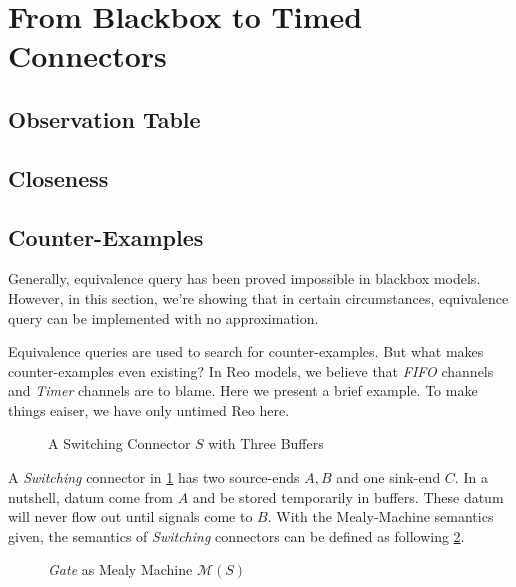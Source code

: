 \documentclass[conference, a4paper]{IEEEtran}
\begin{document}

\section{From Blackbox to Timed Connectors}

\subsection{Observation Table}

\subsection{Closeness}

\subsection{Counter-Examples}
Generally, equivalence query has been proved impossible in blackbox
models\cite{DBLP:journals/iandc/Angluin87}. However, in this
section, we're showing that in certain circumstances, equivalence query can be implemented with
no approximation.

Equivalence queries are used to search for counter-examples. But what makes counter-examples even
existing? In Reo models, we believe that \emph{FIFO} channels and \emph{Timer} channels are to
blame. Here we present a brief example. To make things eaiser, we have only untimed Reo here.

\begin{figure}[h]
  \begin{center}
    
  \end{center}
  \caption{A Switching Connector $S$ with Three Buffers}
  \label{fig:buf3}
\end{figure}

A \emph{Switching} connector in \figurename \ref{fig:buf3} has two source-ends $A,B$ and one
sink-end $C$. In a nutshell, datum come from $A$ and be stored temporarily in buffers. These datum
will never flow out until signals come to $B$. With the Mealy-Machine semantics given, the semantics
of \emph{Switching} connectors can be defined as following \figurename \ref{fig:buf3semantics}.

\begin{figure}[h]
  \begin{center}
    
  \end{center}
  \caption{\emph{Gate} as Mealy Machine $\mathcal{M}(S)$}
  \label{fig:buf3semantics}
\end{figure}
\end{document}
